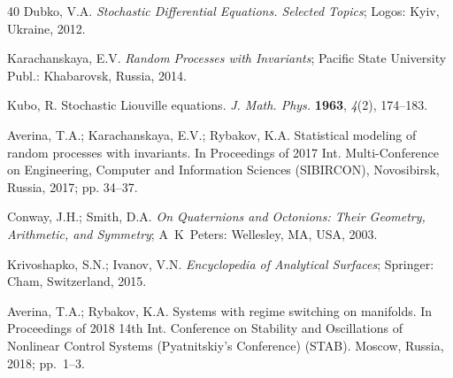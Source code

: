 \documentclass[10pt,reqno]{amsart}
\theoremstyle{plain}
\theoremstyle{remark}
\begin{document}
\begin{thebibliography}{40}
Dubko, V.A. {\em Stochastic Differential Equations. Selected Topics}; Logos: Kyiv, Ukraine, 2012.

Karachanskaya, E.V. {\em Random Processes with Invariants}; Pacific State University Publ.: Khabarovsk, Russia, 2014.

Kubo, R. Stochastic Liouville equations. {\em J. Math. Phys.} {\bf 1963}, {\em 4}(2), 174--183.

Averina, T.A.; Karachanskaya, E.V.; Rybakov, K.A. Statistical modeling of random processes with invariants. In Proceedings of 2017 Int. Multi-Conference on Engineering, Computer and Information Sciences (SIBIRCON), Novosibirsk, Russia, 2017; pp. 34--37. %

Conway, J.H.; Smith, D.A. {\em On Quaternions and Octonions: Their Geometry, Arithmetic, and Symmetry}; A~K~Peters: Wellesley, MA, USA, 2003.

Krivoshapko, S.N.; Ivanov, V.N. {\em Encyclopedia of Analytical Surfaces}; Springer: Cham, Switzerland, 2015.

Averina, T.A.; Rybakov, K.A. Systems with regime switching on manifolds. In Proceedings of 2018 14th Int. Conference on Stability and Oscillations of Nonlinear Control Systems (Pyatnitskiy's Conference) (STAB). Moscow, Russia, 2018; pp.~1--3. %

\end{thebibliography}
\end{document}
